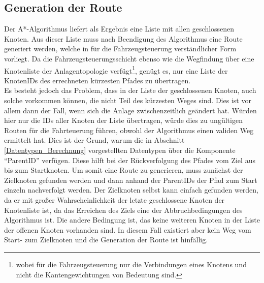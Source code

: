 		\subsection{Generation der Route}
			\label{Routengeneration}
			Der A*-Algorithmus liefert als Ergebnis eine Liste mit allen geschlossenen Knoten. Aus dieser Liste muss nach Beendigung des Algorithmus eine Route generiert werden, welche in für die Fahrzeugsteuerung verständlicher Form vorliegt. Da die Fahrzeugsteuerungsschicht ebenso wie die Wegfindung über eine Knotenliste der Anlagentopologie verfügt\footnote{wobei für die Fahrzeugsteuerung nur die Verbindungen eines Knotens und nicht die Kantengewichtungen von  Bedeutung sind.}, genügt es, nur eine Liste der KnotenIDs des errechneten kürzesten Pfades zu übertragen.
			\\
			Es besteht jedoch das Problem, dass in der Liste der geschlossenen Knoten, auch solche vorkommen können, die nicht Teil des kürzesten Weges sind. Dies ist vor allem dann der Fall, wenn sich die Anlage zwischenzeitlich geändert hat. Würden hier nur die IDs aller Knoten der Liste übertragen, würde dies zu ungültigen Routen für die Fahrteuerung führen, obwohl der Algorithmus einen validen Weg ermittelt hat. Dies ist der Grund, warum die in Abschnitt \ref{Datentypen_Berechnung} vorgestellten Datentypen über die Komponente "`ParentID"' verfügen. Diese hilft bei der Rückverfolgung  des Pfades vom Ziel aus bis zum Startknoten. Um somit eine Route zu generieren, muss zunächst der Zielknoten gefunden werden und dann anhand der ParentIDs der Pfad zum Start einzeln nachverfolgt werden. Der Zielknoten selbst kann einfach gefunden werden, da er mit großer Wahrscheinlichkeit der letzte geschlossene Knoten der Knotenliste ist, da das Erreichen des Ziels eine der Abbruchbedingungen des Algorithmus ist. Die andere Bedingung ist, das keine weiteren Knoten in der Liste der offenen Knoten vorhanden sind. In diesem Fall existiert aber kein Weg vom Start- zum Zielknoten und die Generation der Route ist hinfällig.
			\\
